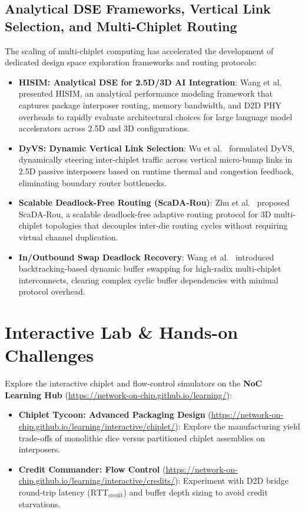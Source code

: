 \subsection{Analytical DSE Frameworks, Vertical Link Selection, and Multi-Chiplet Routing}
\label{sec:ch9_hisim_dyvs}
The scaling of multi-chiplet computing has accelerated the development of dedicated design space exploration frameworks and routing protocols:
\begin{itemize}
    \item \textbf{HISIM: Analytical DSE for 2.5D/3D AI Integration}: Wang et al.~\cite{Wang2025HiSim} presented HISIM, an analytical performance modeling framework that captures package interposer routing, memory bandwidth, and D2D PHY overheads to rapidly evaluate architectural choices for large language model accelerators across 2.5D and 3D configurations.
    \item \textbf{DyVS: Dynamic Vertical Link Selection}: Wu et al.~\cite{Wu2026DyVS} formulated DyVS, dynamically steering inter-chiplet traffic across vertical micro-bump links in 2.5D passive interposers based on runtime thermal and congestion feedback, eliminating boundary router bottlenecks.
    \item \textbf{Scalable Deadlock-Free Routing (ScaDA-Rou)}: Zhu et al.~\cite{Zhu2026ScaDA} proposed ScaDA-Rou, a scalable deadlock-free adaptive routing protocol for 3D multi-chiplet topologies that decouples inter-die routing cycles without requiring virtual channel duplication.
    \item \textbf{In/Outbound Swap Deadlock Recovery}: Wang et al.~\cite{Wang2026Swap} introduced backtracking-based dynamic buffer swapping for high-radix multi-chiplet interconnects, clearing complex cyclic buffer dependencies with minimal protocol overhead.
\end{itemize}

\section{Interactive Lab \& Hands-on Challenges}
\label{sec:ch9_interactive}

Explore the interactive chiplet and flow-control simulators on the \textbf{NoC Learning Hub} (\url{https://network-on-chip.github.io/learning/}):
\begin{itemize}
    \item \textbf{Chiplet Tycoon: Advanced Packaging Design} (\url{https://network-on-chip.github.io/learning/interactive/chiplet/}): Explore the manufacturing yield trade-offs of monolithic dice versus partitioned chiplet assemblies on interposers.
    \item \textbf{Credit Commander: Flow Control} (\url{https://network-on-chip.github.io/learning/interactive/credits/}): Experiment with D2D bridge round-trip latency ($\mathrm{RTT}_{\mathrm{credit}}$) and buffer depth sizing to avoid credit starvations.
\end{itemize}

